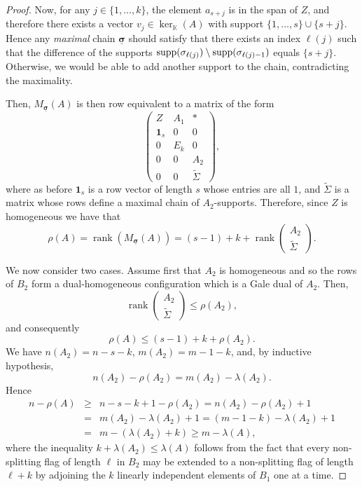 \documentclass[11pt]{amsart}
\theoremstyle{plain}
\theoremstyle{definition}
\theoremstyle{remark}
\newcommand{\rank}{\operatorname{rank}}
\newcommand{\beas}{\begin{eqnarray*}}
\newcommand{\eeas}{\end{eqnarray*}}
\renewcommand{\k}{{\mathbb K}}
\newcommand{\csig}{\ensuremath{\underline{\mathbf \sigma}}}
\numberwithin{equation}{section}
\begin{document}
\begin{proof}
Now, for any $j \in \{1, \dots, k\}$, the element
$a_{s+j}$ is in the  span of $Z$, and therefore there exists a vector $v_j \in \ker_\k(A)$ with
support $\{1, \dots, s\} \cup \{s+j\}$.  Hence  any {\em maximal} chain $\csig$ should satisfy that
 there exists an index $\ell(j)$ such that  the difference of the supports
 ${\rm supp}(\sigma_{\ell(j)}) \setminus {\rm supp}(\sigma_{\ell(j)-1})$ equals
 $\{s+j\}$. Otherwise, we would be able to add another support to the chain, contradicting the maximality.



Then, $M_{\csig}(A)$ is then row equivalent to a matrix of the form
$$\left(\begin{array}{ccc}Z & A_1 & \ast \\{\mathbf 1_s} & 0 & 0 \\0 & E_k & 0 \\0 & 0 & A_{2} \\0 & 0 & \tilde\Sigma\end{array}\right),$$
where as before ${\mathbf 1_s}$ is a row vector of  length $s$ whose entries are all $1$, and 
$\tilde \Sigma$ is a matrix whose rows define a maximal  chain of  $A_2$-supports.
Therefore, since $Z$ is homogeneous we have that
\begin{equation}\label{eqn:rho}
\rho(A) = \rank(M_{\csig}(A)) = (s-1) + k + \rank \left(\begin{array}{c}A_{2} \\ \tilde\Sigma \end{array}\right).
\end{equation}

We now consider two cases. Assume first  that $A_{2}$ is  
homogeneous and so the rows of $B_2$ form a dual-homogeneous configuration
which is a Gale dual of $A_{2}$. Then,
$$\rank \left(\begin{array}{c}A_{2} \\ \tilde\Sigma \end{array}\right) \leq \rho(A_2),$$
and consequently
\[\rho(A) \leq (s-1) + k + \rho(A_{2}).\]
We have $n(A_2) = n -s -k$, $m(A_{2}) = m-1-k$, and, by inductive hypothesis,
$$n(A_2) - \rho(A_2) = m(A_2) - \lambda(A_2).$$
Hence
\beas
n - \rho(A) & \geq & n - s  - k + 1 - \rho(A_2)
= n(A_2) - \rho(A_2) + 1\\
&=& m(A_2) - \lambda(A_2) + 1
= (m-1-k) - \lambda(A_2) + 1\\
&=& m - (\lambda(A_2) + k)
\geq  m- \lambda(A),
\eeas
where the inequality $k + \lambda (A_2) \leq \lambda (A)$ follows from the fact
that every non-splitting flag of length $\ell$ in $B_2$ may be extended to a non-splitting flag of length $\ell + k$ 
by adjoining the $k$ linearly independent elements of $B_1$ one at a time.


\end{proof}
\end{document}
